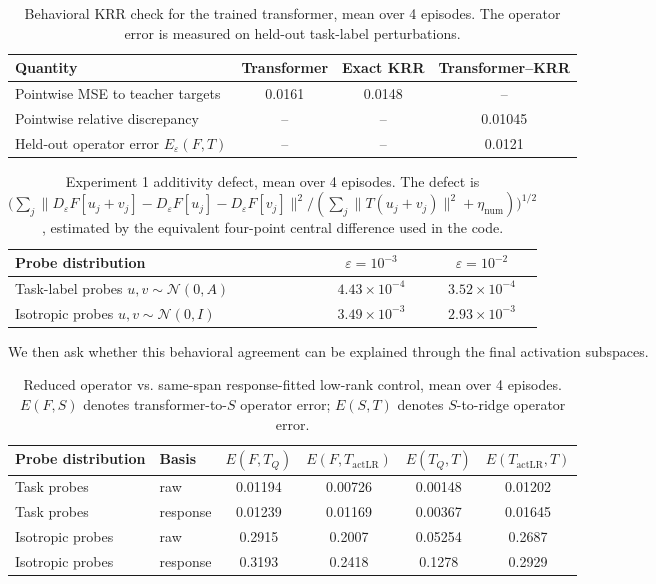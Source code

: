 \documentclass[11pt]{article}
\begin{document}
\begin{table}[ht]
\centering
\caption{Behavioral KRR check for the trained transformer, mean over 4 episodes. The operator
error is measured on held-out task-label perturbations.}
\begin{tabular}{lccc}
\toprule
Quantity & Transformer & Exact KRR & Transformer--KRR\\
\midrule
Pointwise MSE to teacher targets & 0.0161 & 0.0148 & --\\
Pointwise relative discrepancy & -- & -- & 0.01045\\
Held-out operator error \(E_\varepsilon(F,T)\) & -- & -- & 0.0121\\
\bottomrule
\end{tabular}
\end{table}

\begin{table}[ht]
\centering
\caption{Experiment 1 additivity defect, mean over 4 episodes. The defect is
\(\bigl(\sum_j\|D_\varepsilon F[u_j+v_j]-D_\varepsilon F[u_j]-D_\varepsilon F[v_j]\|^2/
(\sum_j\|T(u_j+v_j)\|^2+\eta_{\mathrm{num}})\bigr)^{1/2}\), estimated by the equivalent
four-point central difference used in the code.}
\begin{tabular}{lcc}
\toprule
Probe distribution & \(\varepsilon=10^{-3}\) & \(\varepsilon=10^{-2}\)\\
\midrule
Task-label probes \(u,v\sim\mathcal{N}(0,A)\) & \(4.43\times10^{-4}\) & \(3.52\times10^{-4}\)\\
Isotropic probes \(u,v\sim\mathcal{N}(0,I)\) & \(3.49\times10^{-3}\) & \(2.93\times10^{-3}\)\\
\bottomrule
\end{tabular}
\end{table}

We then ask whether this behavioral agreement can be explained through the final activation
subspaces.

\begin{table}[ht]
\centering
\caption{Reduced operator vs. same-span response-fitted low-rank control, mean over 4 episodes.
\(E(F,S)\) denotes transformer-to-\(S\) operator error; \(E(S,T)\) denotes \(S\)-to-ridge operator error.}
\begin{tabular}{llcccc}
\toprule
Probe distribution & Basis & \(E(F,T_Q)\) & \(E(F,T_{\mathrm{actLR}})\) & \(E(T_Q,T)\) & \(E(T_{\mathrm{actLR}},T)\)\\
\midrule
Task probes & raw & 0.01194 & 0.00726 & 0.00148 & 0.01202\\
Task probes & response & 0.01239 & 0.01169 & 0.00367 & 0.01645\\
Isotropic probes & raw & 0.2915 & 0.2007 & 0.05254 & 0.2687\\
Isotropic probes & response & 0.3193 & 0.2418 & 0.1278 & 0.2929\\
\bottomrule
\end{tabular}
\end{table}
\end{document}
